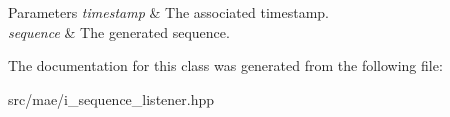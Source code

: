 \begin{DoxyParams}{Parameters}
{\em timestamp} & The associated timestamp. \\
\hline
{\em sequence} & The generated sequence. \\
\hline
\end{DoxyParams}


The documentation for this class was generated from the following file\-:\begin{DoxyCompactItemize}
\item 
src/mae/i\-\_\-sequence\-\_\-listener.\-hpp\end{DoxyCompactItemize}
